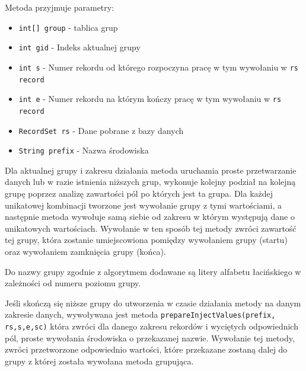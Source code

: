 Metoda przyjmuje parametry:
\begin{itemize}
\item \texttt{int[] group} - tablica grup
\item \texttt{int gid} - Indeks aktualnej grupy
\item\texttt{int s} - Numer rekordu od którego rozpoczyna pracę w tym wywołaniu w \texttt{rs record}
\item \texttt{int e} - Numer rekordu na którym kończy pracę w tym wywołaniu w \texttt{rs record}
\item \texttt{RecordSet rs} - Dane pobrane z bazy danych
\item \texttt{String prefix} - Nazwa środowiska
\end{itemize}
\vspace{5mm}
Dla aktualnej grupy i zakresu działania metoda uruchamia proste przetwarzanie danych lub w razie istnienia niższych grup, wykonuje kolejny podział na kolejną grupę poprzez analizę zawartości pól po których jest ta grupa. Dla każdej unikatowej kombinacji tworzone jest wywołanie grupy z tymi wartościami, a następnie metoda wywołuje samą siebie od zakresu w którym występują dane o unikatowych wartościach. Wywołanie w ten sposób tej metody zwróci zawartość tej grupy, która zostanie umiejscowiona pomiędzy wywołaniem grupy (startu) oraz wywołaniem zamknięcia grupy (końca).
\par 
Do nazwy grupy zgodnie z algorytmem dodawane są litery alfabetu łacińskiego w zależności od numeru poziomu grupy.
\par
Jeśli skończą się niższe grupy do utworzenia w czasie działania metody na danym zakresie danych, wywoływana jest metoda \texttt{prepareInjectValues(prefix, rs,s,e,sc)} która zwróci dla danego zakresu rekordów i wyciętych odpowiednich pól, proste wywołania środowiska o przekazanej nazwie. Wywołanie tej metody, zwróci przetworzone odpowiednio wartości, które przekazane zostaną dalej do grupy z której została wywołana metoda grupująca.

